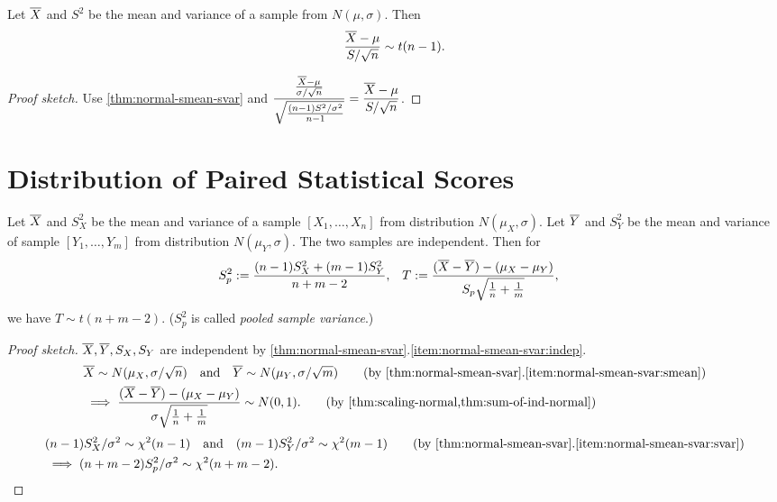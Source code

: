 \documentclass[a4paper, 12pt, fleqn]{article}
\begin{document}
\begin{theorem}
Let $\overline{X}$ and $S^2$ be the mean and variance of a sample from $N(\mu, \sigma)$. Then
\[ \frac{\overline{X} - \mu}{S/\sqrt{n}} \sim t(n-1). \]
\end{theorem}
\begin{proof}[Proof sketch]
Use \cref{thm:normal-smean-svar} and
$\displaystyle \frac{\frac{\overline{X} - \mu}{\sigma/\sqrt{n}}}{\sqrt{\frac{(n-1)S^2/\sigma^2}{n-1}}}
= \frac{\overline{X} - \mu}{S/\sqrt{n}}$.
\end{proof}

\section{Distribution of Paired Statistical Scores}

\begin{theorem}
Let $\overline{X}$ and $S_X^2$ be the mean and variance of a sample $[X_1, \ldots, X_n]$
from distribution $N(\mu_X, \sigma)$.
Let $\overline{Y}$ and $S_Y^2$ be the mean and variance of sample $[Y_1, \ldots, Y_m]$
from distribution $N(\mu_Y, \sigma)$. The two samples are independent.
Then for
\begin{align*}
S_p^2 &:= \frac{(n-1)S_X^2 + (m-1)S_Y^2}{n+m-2},
& T &:= \frac{(\overline{X}-\overline{Y}) - (\mu_X-\mu_Y)}{S_p\sqrt{\frac{1}{n} + \frac{1}{m}}},
\end{align*}
we have $T \sim t(n+m-2)$. ($S_p^2$ is called \emph{pooled sample variance}.)
\end{theorem}
\begin{proof}[Proof sketch]
$\overline{X}, \overline{Y}, S_X, S_Y$ are independent by
\cref{thm:normal-smean-svar}.\ref{item:normal-smean-svar:indep}.
\begin{align*}
& \Xbar \sim N(\mu_X, \sigma/\sqrt{n}) \quad\textrm{and}\quad \Ybar \sim N(\mu_Y, \sigma/\sqrt{m})
    \tag{by \cref{thm:normal-smean-svar}.\ref{item:normal-smean-svar:smean}}
\\ &\implies \frac{(\Xbar - \Ybar) - (\mu_X - \mu_Y)}{\sigma\sqrt{\frac{1}{n} + \frac{1}{m}}} \sim N(0, 1).
    \tag{by \cref{thm:scaling-normal,thm:sum-of-ind-normal}}
\end{align*}
\begin{align*}
& (n-1)S_X^2/\sigma^2 \sim \chi^2(n-1) \quad\textrm{and}\quad (m-1)S_Y^2/\sigma^2 \sim \chi^2(m-1)
    \tag{by \cref{thm:normal-smean-svar}.\ref{item:normal-smean-svar:svar}}
\\ &\implies (n+m-2)S_p^2/\sigma^2 \sim \chi^2(n+m-2).
\qedhere \end{align*}
\end{proof}
\end{document}
